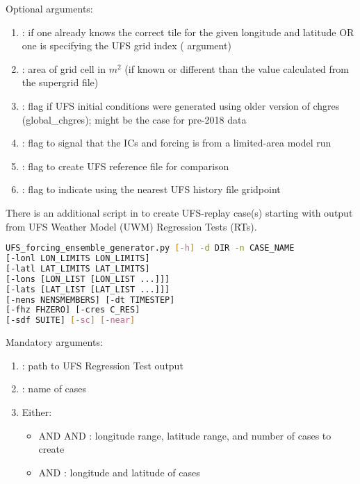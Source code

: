 Optional arguments:
\begin{enumerate}
\item {}: if one already knows the correct tile for the given longitude and latitude OR one is specifying the UFS grid index ( argument)
\item {}: area of grid cell in $m^2$ (if known or different than the value calculated from the supergrid file)
\item {}: flag if UFS initial conditions were generated using older version of chgres (global\_chgres); might be the case for pre-2018 data
\item {}: flag to signal that the ICs and forcing is from a limited-area model run
\item {}: flag to create UFS reference file for comparison
\item {}: flag to indicate using the nearest UFS history file gridpoint
\end{enumerate}

There is an additional script in  to create UFS-replay case(s) starting with output from UFS Weather Model (UWM) Regression Tests (RTs).

\begin{lstlisting}[language=bash]
UFS_forcing_ensemble_generator.py [-h] -d DIR -n CASE_NAME
[-lonl LON_LIMITS LON_LIMITS]
[-latl LAT_LIMITS LAT_LIMITS]
[-lons [LON_LIST [LON_LIST ...]]]
[-lats [LAT_LIST [LAT_LIST ...]]]
[-nens NENSMEMBERS] [-dt TIMESTEP]
[-fhz FHZERO] [-cres C_RES]
[-sdf SUITE] [-sc] [-near]
\end{lstlisting}

Mandatory arguments:
\begin{enumerate}
\item {}: path to UFS Regression Test output
\item {}: name of cases
\item Either:
      \begin{itemize}
           \item {} AND  AND : longitude range, latitude range, and number of cases to create
           \item {} AND : longitude and latitude of cases
      \end{itemize}
\end{enumerate}

